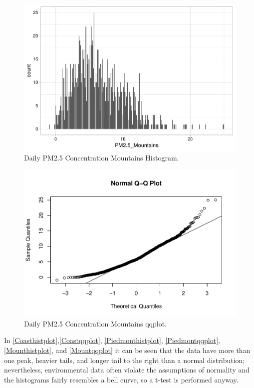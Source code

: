 \documentclass[12pt,]{article}
\begin{document}
\begin{figure}
\centering
\includegraphics{Raby_ENV872_Project_files/figure-latex/unnamed-chunk-46-1.pdf}
\caption{Daily PM2.5 Concentration Mountains Histogram.
\label{Mounthistplot}}
\end{figure}

\begin{figure}
\centering
\includegraphics{Raby_ENV872_Project_files/figure-latex/unnamed-chunk-47-1.pdf}
\caption{Daily PM2.5 Concentration Mountains qqplot.
\label{Mountqqplot}}
\end{figure}

In \autoref{Coasthistplot},\autoref{Coastqqplot},
\autoref{Piedmonthistplot}, \autoref{Piedmontqqplot},
\autoref{Mounthistplot}, and \autoref{Mountqqplot} it can be seen that
the data have more than one peak, heavier tails, and longer tail to the
right than a normal distribution; nevertheless, environmental data often
violate the assumptions of normality and the histograms fairly resembles
a bell curve, so a t-test is performed anyway.
\end{document}
